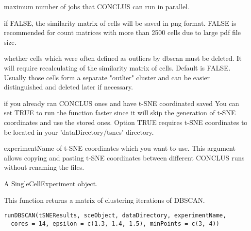 \documentclass[a4paper]{book}
\begin{document}
\begin{Arguments}
\begin{ldescription}
\item[\code{cores}] maximum number of jobs that CONCLUS can run in parallel.

\item[\code{plotPDFcellSim}] if FALSE, the similarity matrix of cells will be saved in png format.
FALSE is recommended for count matrices with more than 2500 cells due to large pdf file size.

\item[\code{deleteOutliers}] whether cells which were often defined as outliers by dbscan must be deleted.
It will require recalculating of the similarity matrix of cells. Default is FALSE.
Usually those cells form a separate "outlier" cluster and can be easier distinguished and deleted later
if necessary.

\item[\code{tSNEalreadyGenerated}] if you already ran CONCLUS ones and have t-SNE coordinated saved
You can set TRUE to run the function faster since it will skip the generation of t-SNE coordinates and use the stored ones. 
Option TRUE requires t-SNE coordinates to be located in your 'dataDirectory/tsnes' directory.

\item[\code{tSNEresExp}] experimentName of t-SNE coordinates which you want to use.
This argument allows copying and pasting t-SNE coordinates between different CONCLUS runs without renaming the files.
\end{ldescription}
\end{Arguments}
%
\begin{Value}
A SingleCellExperiment object.
\end{Value}
%
\begin{Description}\relax
This function returns a matrix of clustering iterations of DBSCAN.
\end{Description}
%
\begin{Usage}
\begin{verbatim}
runDBSCAN(tSNEResults, sceObject, dataDirectory, experimentName,
  cores = 14, epsilon = c(1.3, 1.4, 1.5), minPoints = c(3, 4))
\end{verbatim}
\end{Usage}
%
\end{document}
